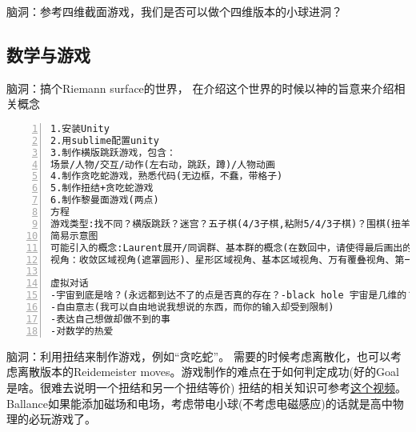 \documentclass[11pt]{amsart}
\begin{document}
脑洞：参考四维截面游戏，我们是否可以做个四维版本的小球进洞？

\subsection{数学与游戏}


脑洞：搞个Riemann surface的世界， 在介绍这个世界的时候以神的旨意来介绍相关概念
\begin{lstlisting}[numbers=left,numberstyle=\tiny,numbersep=10pt]
1.安装Unity
2.用sublime配置unity
3.制作横版跳跃游戏，包含：
场景/人物/交互/动作(左右动，跳跃，蹲)/人物动画
4.制作贪吃蛇游戏，熟悉代码(无边框，不蠢，带格子)
5.制作扭结+贪吃蛇游戏
6.制作黎曼面游戏(两点)
方程
游戏类型:找不同？横版跳跃？迷宫？五子棋(4/3子棋,粘附5/4/3子棋)？围棋(扭羊头游戏)?跳棋？空间爬行？扭结+贪吃蛇？塔防？数独？数回？华容道？ORBOX B?(这玩意可以做成三维版本!4维就有点难了)(mini metro？连连看？泡泡龙？消砖块？2048？推箱子？其他的Nikoli Puzzles？)
简易示意图
可能引入的概念:Laurent展开/同调群、基本群的概念(在数回中，请使得最后画出的曲线表示基本群不平凡但是同调群不平凡)/覆叠，万有覆叠，deck transformation(华容道简化难度:允许deck transformation将区块变换至另一个基本区域中相同的位置；或者，我们允许上下粘接)/曲率/曲率驱动游戏/descent(数独解何时能成为更小的黎曼面的解)
视角：收敛区域视角(遮罩圆形)、星形区域视角、基本区域视角、万有覆叠视角、第一人称视角、二维3D视角(视角需要通过"培训+考试"解锁)

虚拟对话
-宇宙到底是啥？(永远都到达不了的点是否真的存在？-black hole 宇宙是几维的？2+3(颜色)+1(时间) 如何测量时间，or时间的流逝是否是均匀的？)
-自由意志(我可以自由地说我想说的东西，而你的输入却受到限制)
-表达自己想做却做不到的事
-对数学的热爱

\end{lstlisting}

脑洞：利用扭结来制作游戏，例如“贪吃蛇”。 需要的时候考虑离散化，也可以考虑离散版本的Reidemeister moves。游戏制作的难点在于如何判定成功(好的Goal是啥。很难去说明一个扭结和另一个扭结等价)
扭结的相关知识可参考\href{https://www.youtube.com/watch?v=nYz3pRk1cCA}{这个视频}。Ballance如果能添加磁场和电场，考虑带电小球(不考虑电磁感应)的话就是高中物理的必玩游戏了。
\end{document}
